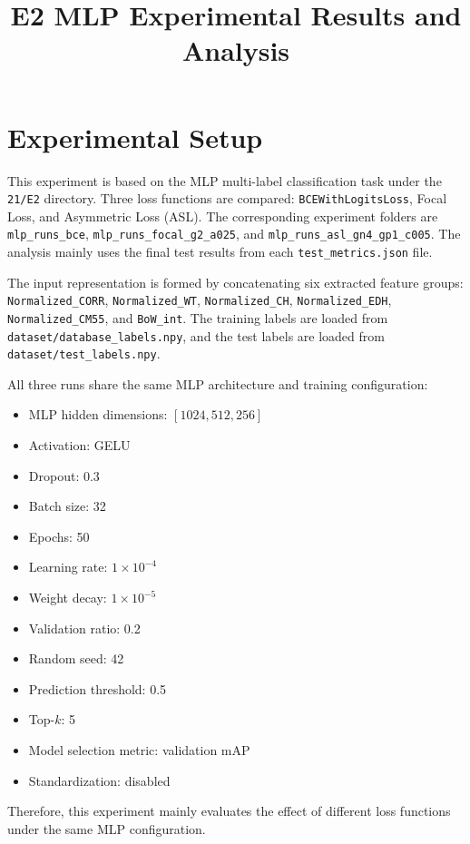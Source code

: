 \documentclass{article}
\title{E2 MLP Experimental Results and Analysis}
\author{}
\date{}
\begin{document}
\maketitle

\section{Experimental Setup}

This experiment is based on the MLP multi-label classification task under the
\texttt{21/E2} directory. Three loss functions are compared:
\texttt{BCEWithLogitsLoss}, Focal Loss, and Asymmetric Loss (ASL).
The corresponding experiment folders are
\texttt{mlp\_runs\_bce},
\texttt{mlp\_runs\_focal\_g2\_a025}, and
\texttt{mlp\_runs\_asl\_gn4\_gp1\_c005}.
The analysis mainly uses the final test results from each \texttt{test\_metrics.json} file.

The input representation is formed by concatenating six extracted feature groups:
\texttt{Normalized\_CORR},
\texttt{Normalized\_WT},
\texttt{Normalized\_CH},
\texttt{Normalized\_EDH},
\texttt{Normalized\_CM55}, and
\texttt{BoW\_int}.
The training labels are loaded from \texttt{dataset/database\_labels.npy}, and the test
labels are loaded from \texttt{dataset/test\_labels.npy}.

All three runs share the same MLP architecture and training configuration:

\begin{itemize}
    \item MLP hidden dimensions: \([1024, 512, 256]\)
    \item Activation: GELU
    \item Dropout: 0.3
    \item Batch size: 32
    \item Epochs: 50
    \item Learning rate: \(1 \times 10^{-4}\)
    \item Weight decay: \(1 \times 10^{-5}\)
    \item Validation ratio: 0.2
    \item Random seed: 42
    \item Prediction threshold: 0.5
    \item Top-\(k\): 5
    \item Model selection metric: validation mAP
    \item Standardization: disabled
\end{itemize}

Therefore, this experiment mainly evaluates the effect of different loss functions
under the same MLP configuration.
\end{document}
